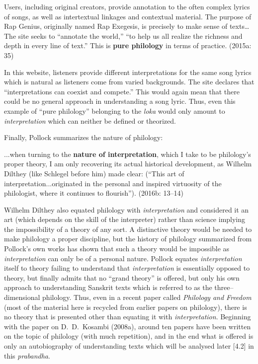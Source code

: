 \begin{myquote}
Users, including original creators, provide annotation to the often complex lyrics of songs, as well as intertextual linkages and contextual material. The purpose of Rap Genius, originally named Rap Exegesis, is precisely to make sense of texts… The site seeks to “annotate the world,” “to help us all realize the richness and depth in every line of text.” This is \textbf{pure philology} in terms of practice. (2015a: 35)
\end{myquote}

In this website, listeners provide different interpretations for the same song lyrics which is natural as listeners come from varied backgrounds. The site declares that “interpretations can coexist and compete.” This would again mean that there could be no general approach in understanding a song lyric. Thus, even this example of “pure philology” belonging to the \textit{loka} would only amount to \textit{interpretation} which can neither be defined or theorized.

Finally, Pollock summarizes the nature of philology:

\begin{myquote}
...when turning to the \textbf{nature of interpretation}, which I take to be philology’s proper theory, I am only recovering its actual historical development, as Wilhelm Dilthey (like Schlegel before him) made clear: (“This art of interpretation...originated in the personal and inspired virtuosity of the philologist, where it continues to flourish”). (2016b: 13–14)
\end{myquote}

Wilhelm Dilthey also equated philology with \textit{interpretation} and considered it an art (which depends on the skill of the interpreter) rather than science implying the impossibility of a theory of any sort. A distinctive theory would be needed to make philology a proper discipline, but the history of philology summarized from Pollock’s own works has shown that such a theory would be impossible as \textit{interpretation} can only be of a personal nature. Pollock equates \textit{interpretation} itself to theory failing to understand that\textit{ interpretation} is essentially opposed to theory, but finally admits that no “grand theory” is offered, but only his own approach to understanding Sanskrit texts which is referred to as the three–dimensional philology. Thus, even in a recent paper called \textit{Philology and Freedom} (most of the material here is recycled from earlier papers on philology), there is no theory that is presented other than equating it with \textit{interpretation}. Beginning with the paper on D.~D.~Kosambi (2008a), around ten papers have been written on the topic of philology (with much repetition), and in the end what is offered is only an autobiography of understanding texts which will be analysed later [4.2] in this \textit{prabandha}.

